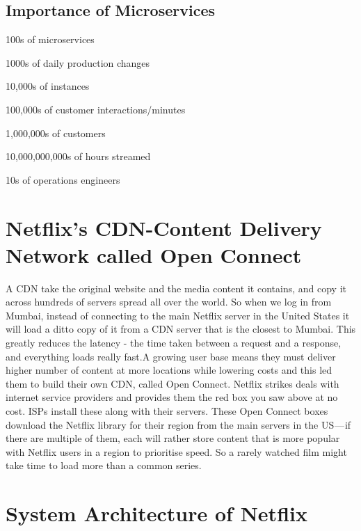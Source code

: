 \documentclass[9pt,twocolumn,twoside]{optica-suppl-materials}
\begin{document}
\subsection*{Importance of Microservices}

\begin{condenseditemize}
\item[] 100s of microservices
\item[] 1000s of daily production changes
\item[] 10,000s of instances
\item[] 100,000s of customer interactions/minutes
\item[] 1,000,000s of customers
\item[] 10,000,000,000s of hours streamed
\item[] 10s of operations engineers
\end{condenseditemize}

\section{Netflix's CDN-Content Delivery Network called Open Connect}
A CDN take the original website and the media content it contains, and copy it across hundreds of servers spread all over the world. So when we log in from Mumbai, instead of connecting to the main Netflix server in the United States it will load a ditto copy of it from a CDN server that is the closest to Mumbai. This greatly reduces the latency - the time taken between a request and a response, and everything loads really fast.A growing user base means they must deliver higher number of content at more locations while lowering costs and this led them to build their own CDN, called Open Connect.
Netflix strikes deals with internet service providers and provides them the red box you saw above at no cost. ISPs install these along with their servers. These Open Connect boxes download the Netflix library for their region from the main servers in the US — if there are multiple of them, each will rather store content that is more popular with Netflix users in a region to prioritise speed. So a rarely watched film might take time to load more than a common series. 

\section{System Architecture of Netflix}
\end{document}
